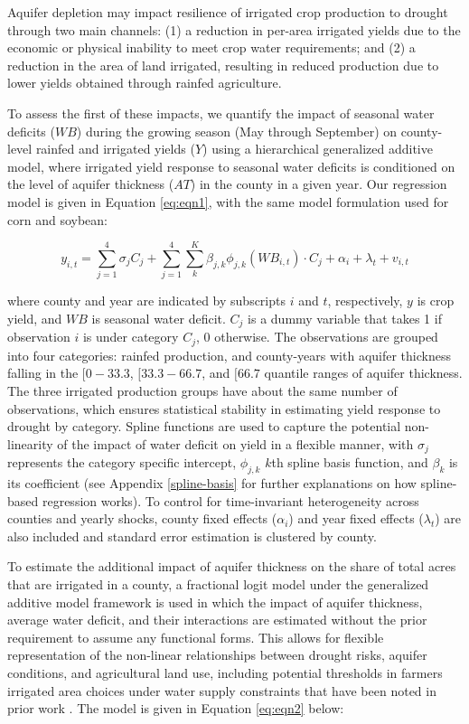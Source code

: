 \documentclass[
]{article}
\begin{document}
Aquifer depletion may impact resilience of irrigated crop production to drought through two main channels: (1) a reduction in per-area irrigated yields due to the economic or physical inability to meet crop water requirements; and (2) a reduction in the area of land irrigated, resulting in reduced production due to lower yields obtained through rainfed agriculture.

To assess the first of these impacts, we quantify the impact of seasonal water deficits (\(WB\)) during the growing season (May through September) on county-level rainfed and irrigated yields (\(Y\)) using a hierarchical generalized additive model, where irrigated yield response to seasonal water deficits is conditioned on the level of aquifer thickness (\(AT\)) in the county in a given year. Our regression model is given in Equation \eqref{eq:eqn1}, with the same model formulation used for corn and soybean:

\begin{equation}
y_{i,t} = \sum_{j=1}^4 \sigma_j C_j + \sum_{j=1}^4 \sum_{k}^K \beta_{j,k}\phi_{j,k}(WB_{i,t})\cdot C_j  + \alpha_i + \lambda_t + v_{i,t} \label{eq:eqn1}
\end{equation}

where county and year are indicated by subscripts \(i\) and \(t\), respectively, \(y\) is crop yield, and \(WB\) is seasonal water deficit. \(C_j\) is a dummy variable that takes 1 if observation \(i\) is under category \(C_j\), 0 otherwise. The observations are grouped into four categories: rainfed production, and county-years with aquifer thickness falling in the \([0-33.3%
\), \([33.3-66.7%
\), and \([66.7%
\) quantile ranges of aquifer thickness. The three irrigated production groups have about the same number of observations, which ensures statistical stability in estimating yield response to drought by category. Spline functions are used to capture the potential non-linearity of the impact of water deficit on yield in a flexible manner, with \(\sigma_j\) represents the category specific intercept, \(\phi_{j,k}\) \(k\)th spline basis function, and \(\beta_k\) is its coefficient (see Appendix \ref{spline-basis} for further explanations on how spline-based regression works). To control for time-invariant heterogeneity across counties and yearly shocks, county fixed effects (\(\alpha_i\)) and year fixed effects (\(\lambda_t\)) are also included and standard error estimation is clustered by county.

To estimate the additional impact of aquifer thickness on the share of total acres that are irrigated in a county, a fractional logit model under the generalized additive model framework is used in which the impact of aquifer thickness, average water deficit, and their interactions are estimated without the prior requirement to assume any functional forms. This allows for flexible representation of the non-linear relationships between drought risks, aquifer conditions, and agricultural land use, including potential thresholds in farmers irrigated area choices under water supply constraints that have been noted in prior work \citep{foster2015well, foster2015analysis, hrozencik2017heterogeneous}. The model is given in Equation \eqref{eq:eqn2} below:
\end{document}
